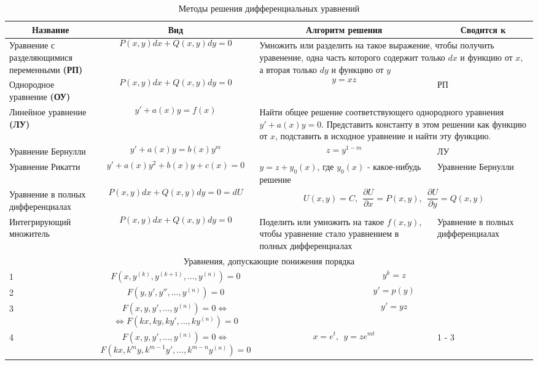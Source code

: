 \documentclass{article}
\author{Валентинов Александр}
\newcommand{\pd}[2]{\frac{\partial {#1}}{\partial {#2}}}
\begin{document}
\begin{table}
   \begin{center}
   \caption{Методы решения дифференциальных уравнений}
   \begin{tabular}{|p{2.5cm}|p{6cm}|p{4cm}|p{2.5cm}|}
   \hline 
   \multicolumn{1}{|c}{Название} & \multicolumn{1}{|c}{Вид} & \multicolumn{1}{|c}{Алгоритм решения} & \multicolumn{1}{|c|}{Сводится к} \\ \hline 
   Уравнение с разделяющимися переменными \textbf{(РП)} & $$ P(x, y)dx + Q(x, y)dy = 0 $$ & \multicolumn{2}{|p{7.5cm}|}{Умножить или разделить на такое выражение, чтобы получить уравенение, одна часть которого содержит только $dx$ и функцию от $x$, а вторая только $dy$ и функцию от $y$}\\ \hline 
   Однородное уравнение \textbf{(ОУ)} & $$ P(x, y)dx + Q(x, y)dy = 0 $$ & $$ y = xz $$ & РП \\ \hline 
   Линейное уравнение \textbf{(ЛУ)}& $$ y' + a(x)y = f(x) $$ & \multicolumn{2}{|p{7.5cm}|}{Найти общее решение соответствующего однородного уравнения $y' + a(x)y = 0$. Представить константу в этом решении как функцию от $x$, подставить в исходное уравнение и найти эту функцию.}\\ \hline 
   Уравнение Бернулли & $$y' + a(x)y = b(x)y^m$$ & $$z = y^{1-m}$$ & ЛУ \\ \hline 
   Уравнение Рикатти & $$y' + a(x)y^2 + b(x)y + c(x) = 0$$ & $y = z + y_0(x)$, где $y_0(x)$ - какое-нибудь решение & Уравнение Бернулли\\ \hline 
   Уравнение в полных дифференциалах & $$ P(x, y)dx + Q(x, y)dy = 0 = dU $$ & \multicolumn{2}{|p{7.5cm}|}{$$U(x, y) = C, ~~\pd{U}{x} = P(x, y),~~\pd{U}{y} = Q(x, y)$$} \\ \hline 
   Интегрирующий множитель & $$ P(x, y)dx + Q(x, y)dy = 0 $$ & Поделить или умножить на такое $f(x, y)$, чтобы уравнение стало уравнением в полных дифференциалах & Уравнение в полных дифференциалах\\ \hline 
   \multicolumn{4}{|c|}{Уравнения, допускающие понижения порядка} \\ \hline
   1 & $$ F(x, y^{(k)}, y^{(k+1)}, \ldots, y^{(n)}) = 0 $$ & \multicolumn{2}{|p{7.5cm}|}{$$ y^k = z $$} \\ \hline 
   2 & $$ F(y, y', y'', \ldots, y^{(n)}) = 0 $$ & \multicolumn{2}{|p{7.5cm}|}{$$ y' = p(y) $$} \\ \hline 
   3 & $$ F(x, y, y', \ldots, y^{(n)}) = 0 \Leftrightarrow $$ $$ \Leftrightarrow F(kx, ky, ky', \ldots, ky^{(n)}) = 0 $$ & \multicolumn{2}{|p{7.5cm}|}{$$ y' = yz $$} \\ \hline
   4 & $$ F(x, y, y', \ldots, y^{(n)}) = 0 \Leftrightarrow $$ $$ F(kx, k^m y, k^{m - 1} y', \ldots, k^{m - n}y^{(n)}) = 0 $$ & $$ x = e^t,~~ y = ze^{mt} $$ & 1 - 3 \\ \hline 
   \end{tabular}
   \end{center} 
   \end{table} 
\end{document}
